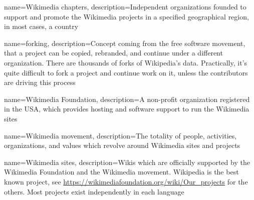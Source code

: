 
{
	name=Wikimedia chapters,
	description={Independent organizations founded to support and promote the Wikimedia projects in a specified geographical region, in most cases, a country}
}

{
	name=forking,
	description={Concept coming from the free software movement, that a project can be copied, rebranded, and continue under a different organization.  There are thousands of forks of Wikipedia's data.  Practically, it's quite difficult to fork a project and continue work on it, unless the contributors are driving this process}
}

{
	name=Wikimedia Foundation,
	description={A non-profit organization registered in the USA, which provides hosting and software support to run the Wikimedia sites}
}

{
	name=Wikimedia movement,
	description={The totality of people, activities, organizations, and values which revolve around Wikimedia sites and projects}
}

{
	name=Wikimedia sites,
	description={Wikis which are officially supported by the Wikimedia Foundation and the Wikimedia movement.  Wikipedia is the best known project, see \url{https://wikimediafoundation.org/wiki/Our_projects} for the others.  Most projects exist independently in each language}
}

